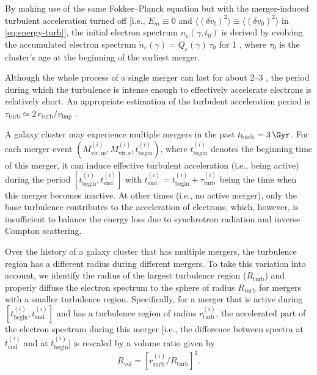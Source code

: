 \documentclass[twocolumn]{aastex62}
\newcommand{\R}[1]{\mathrm{#1}}
\begin{document}
By making use of the same Fokker--Planck equation but with the
merger-induced turbulent acceleration turned off [i.e., $E_m \equiv 0$ and
$\langle (\delta v_t)^2 \rangle \equiv \langle (\delta v_0)^2 \rangle$
in \autoref{eq:energy-turb}],
the initial electron spectrum $n_e(\gamma, t_0)$ is derived by evolving the
accumulated electron spectrum $\tilde{n}_e(\gamma) = Q_e(\gamma) \,\tau_0$
for \SI{1}{\Gyr} \citep[e.g.,][]{brunetti2007}, where $\tau_0$ is the
cluster's age at the beginning of the earliest merger.

Although the whole process of a single merger can last for about
\SIrange{2}{3}{\Gyr} \citep[e.g.,][]{tormen2004,cassano2016}, the period
during which the turbulence is intense enough to effectively accelerate
electrons is relatively short.
An appropriate estimation of the turbulent acceleration period is
$\tau_{\R{turb}} \simeq 2 \,r_{\R{turb}} / v_{\R{imp}}$ \citep{miniati2015}.

A galaxy cluster may experience multiple mergers in the past
$t_{\R{back}} = \SI{3}{\Gyr}$.
For each merger event
$\left( M^{(i)}_{\R{vir,m}}, M^{(i)}_{\R{vir,s}}, t^{(i)}_{\R{begin}} \right)$,
where $t^{(i)}_{\R{begin}}$ denotes the beginning time of this merger,
it can induce effective turbulent acceleration (i.e., being active) during
the period $\left[ t^{(i)}_{\R{begin}}, t^{(i)}_{\R{end}} \right]$ with
$t^{(i)}_{\R{end}} = t^{(i)}_{\R{begin}}+\tau^{(i)}_{\R{turb}}$ being the
time when this merger becomes inactive.
At other times (i.e., no active merger), only the base turbulence
contributes to the acceleration of electrons, which, however,
is insufficient to balance the energy loss due to synchrotron radiation
and inverse Compton scattering.

Over the history of a galaxy cluster that has multiple mergers, the
turbulence region has a different radius during different mergers.
To take this variation into account, we identify the radius of the largest
turbulence region ($R_{\R{turb}}$) and properly diffuse the electron
spectrum to the sphere of radius $R_{\R{turb}}$ for mergers with a smaller
turbulence region.
Specifically, for a merger that is active during 
$\left[ t^{(i)}_{\R{begin}}, t^{(i)}_{\R{end}} \right]$ and has a
turbulence region of radius $r^{(i)}_{\R{turb}}$, the accelerated part of
the electron spectrum during this merger [i.e., the difference between
spectra at $t^{(i)}_{\R{end}}$ and at $t^{(i)}_{\R{begin}}$] is rescaled
by a volume ratio given by
\begin{equation}
  \label{eq:ratio-v}
  R_{\R{vol}} = \left[ r^{(i)}_{\R{turb}} \Big/ R_{\R{turb}} \right]^3 .
\end{equation}
\end{document}
